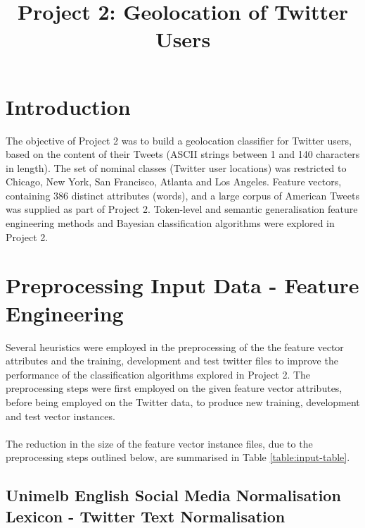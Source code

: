 \documentclass[11pt]{article}
\begin{document}
\title{Project 2: Geolocation of Twitter Users}
\maketitle

\section{Introduction}
The objective of Project 2 was to build a geolocation classifier for Twitter users, based on the content of their Tweets (ASCII strings between 1 and 140 characters in length). The set of nominal classes (Twitter user locations) was restricted to Chicago, New York, San Francisco, Atlanta and Los Angeles. Feature vectors, containing 386 distinct attributes (words), and a large corpus of American Tweets was supplied as part of Project 2. Token-level and semantic generalisation feature engineering methods and Bayesian classification algorithms were explored in Project 2.

\section{Preprocessing Input Data - Feature Engineering}  

Several heuristics were employed in the preprocessing of the the feature vector attributes and the training, development and test twitter files to improve the performance of the classification algorithms explored in Project 2. The preprocessing steps were first employed on the given feature vector attributes, before being employed on the Twitter data, to produce new training, development and test vector instances.\\\\
The reduction in the size of the feature vector instance files, due to the preprocessing steps outlined below, are summarised in Table \ref{table:input-table}.

\subsection{Unimelb English Social Media Normalisation Lexicon - Twitter Text Normalisation}
\label{subsec:normal}
\end{document}
